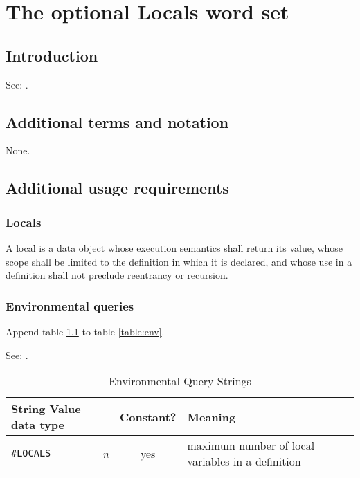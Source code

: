 
\chapter{The optional Locals word set} %

\section{Introduction} %
\label{locals:intro}

\cbstart{}
See: .
\cbend

\section{Additional terms and notation} %

None.

\section{Additional usage requirements} %

\subsection{Locals} %

A local is a data object whose execution semantics shall return its
value, whose scope shall be limited to the definition in which it is
declared, and whose use in a definition shall not preclude reentrancy
or recursion.

\subsection{Environmental queries} %

Append table \ref{local:env} to table \ref{table:env}.

See: .

\begin{table}[h]
  \begin{center}
	\caption{Environmental Query Strings}
	\label{local:env}
	\begin{tabular}{p{9em}rcp{}}
		\hline\hline
		\multicolumn{2}{l}{String \hfill Value data type} & Constant? & Meaning \\
		\hline
		\texttt{\#LOCALS}		& \emph{n}	& yes
			& maximum number of local variables in a definition \\
		\hline\hline
	\end{tabular}
  \end{center}
\end{table}

